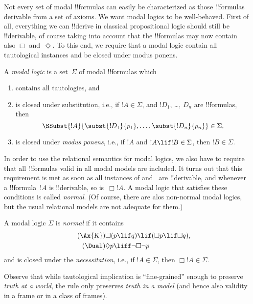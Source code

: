 \documentclass[../../../include/open-logic-section]{subfiles}
\begin{document}


Not every set of modal !!{formula}s can easily be characterized as
those !!{formula}s derivable from a set of axioms. We want modal
logics to be well-behaved. First of all, everything we can !!{derive}
in classical propositional logic should still be !!{derivable}, of
course taking into account that the !!{formula}s may now contain also
$\Box$ and~$\Diamond$. To this end, we require that a modal logic
contain all tautological instances and be closed under modus ponens.

\begin{defn}
  A \emph{modal logic} is a set~$\Sigma$ of modal !!{formula}s which
  \begin{enumerate}
  \item contains all tautologies, and
  \item is closed under substitution, i.e., if $!A \in \Sigma$, and
    $!D_1$, \dots, $D_n$ are !!{formula}s, then
    \[
    \SSubst{!A}{\subst{!D_1}{p_1}, \dots, \subst{!D_n}{p_n}} \in \Sigma,
    \]
    \item is closed under \emph{modus ponens}, i.e., if $!A$ and $!A
      \lif !B \in \Sigma$, then $!B \in \Sigma$.
  \end{enumerate}
\end{defn}

In order to use the relational semantics for modal logics, we also
have to require that all !!{formula}s valid in all modal models are
included. It turns out that this requirement is met as soon as all
instances of  and~\Dual{} are !!{derivable}, and whenever a
!!{formula}~$!A$ is !!{derivable}, so is~$\Box !A$. A modal logic that
satisfies these conditions is called \emph{normal}. (Of course, there
are alos non-normal modal logics, but the usual relational models are
not adequate for them.)

\begin{defn}
  A modal logic $\Sigma$ is \emph{normal} if it contains
  \begin{align*}
  \tag{\Ax{K}} & \Box(p \lif q) \lif (\Box p \lif \Box q),\\
  \tag{\Dual} & \Diamond p \liff \lnot\Box\lnot p
  \end{align*}
  and is closed under the \emph{necessitation}, i.e., if $!A \in
  \Sigma$, then $\Box !A \in \Sigma$.
\end{defn}

Observe that while tautological implication is ``fine-grained'' enough
to preserve \emph{truth at a world}, the rule \RK{} only preserves
\emph{truth in a model} (and hence also validity in a frame or in a
class of frames).
\end{document}
